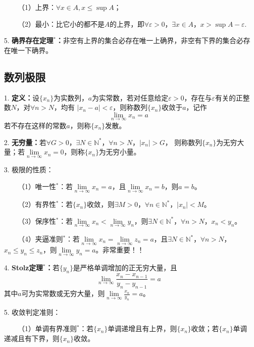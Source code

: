 ~~~~（1）上界：$\forall x \in A, x \leqslant \sup A$；

~~~~（2）最小：比它小的都不是$A$的上界，即$\forall \varepsilon>0$，$\exists x \in A$，$x>\sup A-\varepsilon$.

5. \textbf{确界存在定理$^*$：}非空有上界的集合必存在唯一上确界，非空有下界的集合必存在唯一下确界。

\subsection{数列极限}


1. \textbf{定义：}设$\{x_n\}$为实数列，$a$为实常数，若对任意给定$\varepsilon>0$，存在与$\varepsilon$有关的正整数$N$，对$\forall n>N$，均有
$\left|x_n-a\right|<\varepsilon$，则称数列$\{x_n\}$收敛于$a$，记作
\begin{equation*}
    \lim\limits_{n\rightarrow \infty}x_n=a
\end{equation*}
若不存在这样的常数$a$，则称$\{x_n\}$发散。

2. \textbf{无穷量：}若$\forall G>0$，$\exists N \in \mathbb{N}^*$，$\forall n>N$，$\left|x_n \right|>G$，
则称数列$\{x_n\}$为无穷大量；若$\lim\limits_{n\rightarrow \infty}x_n=0$，则称$\{x_n\}$为无穷小量。

3. 极限的性质：

~~~~（1）唯一性$^*$：若$\lim\limits_{n\rightarrow \infty}x_n=a$，且$\lim\limits_{n\rightarrow \infty}x_n=b$，则$a=b$。

~~~~（2）有界性$^*$：若$\{x_n\}$收敛，则$\exists M >0$，$\forall n \in \mathbb{N}^*$，$\left|x_n\right|<M$。

~~~~（3）保序性$^*$：若$\lim\limits_{n\rightarrow \infty}x_n<\lim\limits_{n\rightarrow \infty}y_n$，则$\exists N\in \mathbb{N}^*$，$\forall n>N$，$x_n<y_n$。

~~~~（4）夹逼准则$^*$：若$\lim\limits_{n\rightarrow \infty}x_n=\lim\limits_{n\rightarrow \infty}z_n=a$，且$\exists N \in \mathbb{N}^*$，$\forall n>N$，$x_n\leqslant y_n\leqslant z_n$，则$\lim\limits_{n\rightarrow \infty}y_n=a$。非常重要！！

4. \textbf{Stolz定理$^*$：}若$\{y_n\}$是严格单调增加的正无穷大量，且
\begin{equation*}
    \lim\limits_{n\rightarrow \infty} \frac{x_n-x_{n-1}}{y_n-y_{n-1}}=a
\end{equation*}
其中$a$可为实常数或无穷大量，则$\lim\limits_{n\rightarrow \infty}\frac{x_n}{y_n}=a$。

5. 收敛判定准则：

~~~~（1）单调有界准则$^*$：若$\{x_n\}$单调递增且有上界，则$\{x_n\}$收敛；若$\{x_n\}$单调递减且有下界，则$\{x_n\}$收敛。

